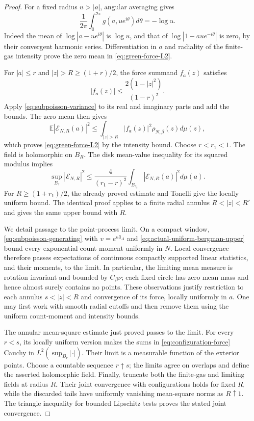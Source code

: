 \documentclass[11pt]{article}
\theoremstyle{remark}\newtheorem{remark}[theorem]{Remark}
\begin{document}
\begin{proof}
For a fixed radius $u>|a|$, angular averaging gives
\[
 \frac1{2\pi}\int_0^{2\pi}g(a,ue^{i\theta})d\theta=-\log u.
\]
Indeed the mean of $\log|a-ue^{i\theta}|$ is $\log u$, and that
of $\log|1-au e^{-i\theta}|$ is zero, by their convergent harmonic
series. Differentiation in $a$ and radiality of the finite-gas
intensity prove the zero mean in \eqref{eq:green-force-L2}.

For $|a|\le r$ and $|z|>R\ge(1+r)/2$, the force summand $f_a(z)$
satisfies
\[
 |f_a(z)|\le\frac{2(1-|z|^2)}{(1-r)^2}.
\]
Apply \eqref{eq:subpoisson-variance} to its real and imaginary
parts and add the bounds. The zero mean then gives
\[
 \mathbb E|\mathcal E_{N,R}(a)|^2
 \le\int_{|z|>R}|f_a(z)|^2\rho_{N,\beta}(z)d\mu(z),
\]
which proves \eqref{eq:green-force-L2} by the intensity bound.
Choose $r<r_1<1$. The field is holomorphic on $B_R$. The disk
mean-value inequality for its squared modulus implies
\[
 \sup_{B_r}|\mathcal E_{N,R}|^2
 \le\frac{4}{(r_1-r)^2}\int_{B_{r_1}}
                     |\mathcal E_{N,R}(a)|^2d\mu(a).
\]
For $R\ge(1+r_1)/2$, the already proved estimate and Tonelli give
the locally uniform bound. The identical proof applies to a finite
radial annulus $R<|z|<R'$ and gives the same upper bound with $R$.

We detail passage to the point-process limit. On a compact window,
\eqref{eq:subpoisson-generating} with $v=e^{u\mathbf1_A}$ and
\eqref{eq:actual-uniform-bergman-upper} bound every exponential
count moment uniformly in $N$. Local convergence therefore passes
expectations of continuous compactly supported linear statistics,
and their moments, to the limit. In particular, the limiting mean
measure is rotation invariant and bounded by $C_\beta\nu$;
each fixed circle has zero mean mass and hence almost surely contains no
points. These observations justify restriction to each annulus
$s<|z|<R$ and convergence of its force, locally uniformly in $a$.
One may first work with smooth radial cutoffs and then remove
them using the uniform count-moment and intensity bounds.

The annular mean-square estimate just proved passes to the limit.
For every $r<s$, its locally uniform version makes the sums in
\eqref{eq:configuration-force} Cauchy in
$L^2(\sup_{B_r}|\cdot|)$. Their limit is a measurable function of
the exterior points. Choose a countable sequence $r\uparrow s$;
the limits agree on overlaps and define the asserted holomorphic
field. Finally, truncate both the finite-gas and limiting fields
at radius $R$. Their joint convergence with configurations holds
for fixed $R$, while the discarded tails have uniformly vanishing
mean-square norms as $R\uparrow1$. The triangle inequality for
bounded Lipschitz tests proves the stated joint convergence.
\end{proof}
\end{document}
